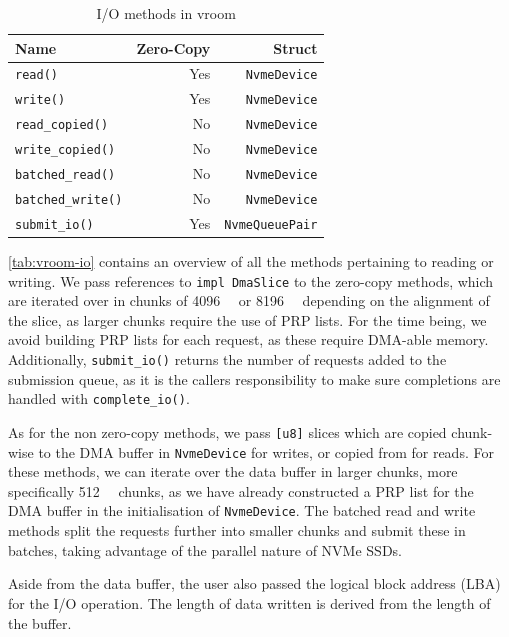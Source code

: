\begin{table}[H]
    \centering
    \begin{tabular}{lrr}
        \textbf{Name} & \textbf{Zero-Copy} & \textbf{Struct} \\
        \toprule
        \texttt{read()} & Yes & \texttt{NvmeDevice} \\ \hline
        \texttt{write()} & Yes & \texttt{NvmeDevice} \\ \hline
        \texttt{read\_copied()} & No & \texttt{NvmeDevice} \\ \hline
        \texttt{write\_copied()} & No & \texttt{NvmeDevice} \\ \hline
        \texttt{batched\_read()} & No & \texttt{NvmeDevice} \\ \hline
        \texttt{batched\_write()} & No & \texttt{NvmeDevice} \\ \hline
        \midrule
        \texttt{submit\_io()} & Yes & \texttt{NvmeQueuePair} \\ \hline
        \bottomrule
    \end{tabular}
    \caption{I/O methods in vroom}
    \label{tab:vroom-io}
\end{table}

\autoref{tab:vroom-io} contains an overview of all the methods pertaining to reading or writing. We pass references to \texttt{impl DmaSlice} to the zero-copy methods, which are iterated over in chunks of \qty{4096}{\kibi\byte} or \qty{8196}{\kibi\byte} depending on the alignment of the slice, as larger chunks require the use of PRP lists. For the time being, we avoid building PRP lists for each request, as these require DMA-able memory. Additionally, \texttt{submit\_io()} returns the number of requests added to the submission queue, as it is the callers responsibility to make sure completions are handled with \texttt{complete\_io()}.

As for the non zero-copy methods, we pass \texttt{[u8]} slices which are copied chunk-wise to the DMA buffer in \texttt{NvmeDevice} for writes, or copied from for reads. For these methods, we can iterate over the data buffer in larger chunks, more specifically \qty{512}{\kibi\byte} chunks, as we have already constructed a PRP list for the DMA buffer in the initialisation of \texttt{NvmeDevice}. The batched read and write methods split the requests further into smaller chunks and submit these in batches, taking advantage of the parallel nature of NVMe SSDs.

Aside from the data buffer, the user also passed the logical block address (LBA) for the I/O operation. The length of data written is derived from the length of the buffer.
